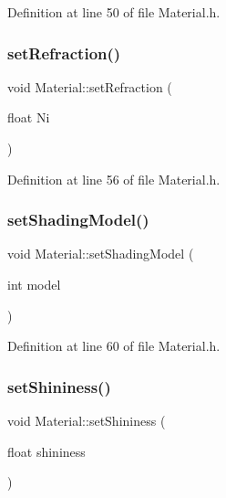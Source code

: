 Definition at line 50 of file Material.\+h.

\mbox{\label{class_material_aa7eeda191689ff20ec61750440c39427}} 
\subsubsection{\texorpdfstring{set\+Refraction()}{setRefraction()}}
{\footnotesize\ttfamily void Material\+::set\+Refraction (\begin{DoxyParamCaption}\item[{float}]{Ni }\end{DoxyParamCaption})\hspace{0.3cm}{\ttfamily [inline]}}



Definition at line 56 of file Material.\+h.

\mbox{\label{class_material_a6b219cb34ef48da8feb6c03459a5c30d}} 
\subsubsection{\texorpdfstring{set\+Shading\+Model()}{setShadingModel()}}
{\footnotesize\ttfamily void Material\+::set\+Shading\+Model (\begin{DoxyParamCaption}\item[{int}]{model }\end{DoxyParamCaption})\hspace{0.3cm}{\ttfamily [inline]}}



Definition at line 60 of file Material.\+h.

\mbox{\label{class_material_a329d0ae8403956a71b1d45b3284f7dd7}} 
\subsubsection{\texorpdfstring{set\+Shininess()}{setShininess()}}
{\footnotesize\ttfamily void Material\+::set\+Shininess (\begin{DoxyParamCaption}\item[{float}]{shininess }\end{DoxyParamCaption})\hspace{0.3cm}{\ttfamily [inline]}}



